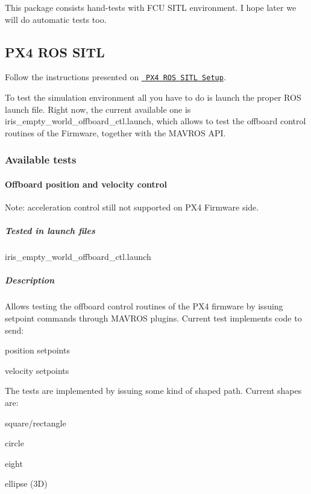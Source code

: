 This package consists hand-\/tests with F\+CU S\+I\+TL environment. I hope later we will do automatic tests too.

\subsection*{P\+X4 R\+OS S\+I\+TL }

Follow the instructions presented on \href{https://pixhawk.org/dev/ros/sitl}{\texttt{ P\+X4 R\+OS S\+I\+TL Setup}}.

To test the simulation environment all you have to do is launch the proper R\+OS launch file. Right now, the current available one is {\ttfamily iris\+\_\+empty\+\_\+world\+\_\+offboard\+\_\+ctl.\+launch}, which allows to test the offboard control routines of the Firmware, together with the M\+A\+V\+R\+OS A\+PI.

\subsubsection*{Available tests}

\paragraph*{Offboard position and velocity control}

Note\+: acceleration control still not supported on P\+X4 Firmware side.

\subparagraph*{Tested in launch files}


\begin{DoxyItemize}
\item {\ttfamily iris\+\_\+empty\+\_\+world\+\_\+offboard\+\_\+ctl.\+launch}
\end{DoxyItemize}

\subparagraph*{Description}

Allows testing the offboard control routines of the P\+X4 firmware by issuing setpoint commands through M\+A\+V\+R\+OS plugins. Current test implements code to send\+:


\begin{DoxyItemize}
\item position setpoints
\item velocity setpoints
\end{DoxyItemize}

The tests are implemented by issuing some kind of shaped path. Current shapes are\+:


\begin{DoxyItemize}
\item square/rectangle
\item circle
\item eight
\item ellipse (3D)
\end{DoxyItemize}

